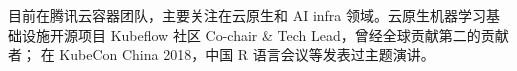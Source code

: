 

\begin{cvparagraph}
\begin{minipage}[t]{\textwidth}
目前在腾讯云容器团队，主要关注在云原生和 AI infra 领域。云原生机器学习基础设施开源项目 Kubeflow 社区 Co-chair \& Tech Lead，曾经全球贡献第二的贡献者；
在 KubeCon China 2018，中国 R 语言会议等发表过主题演讲。
\end{minipage}
\end{cvparagraph}
